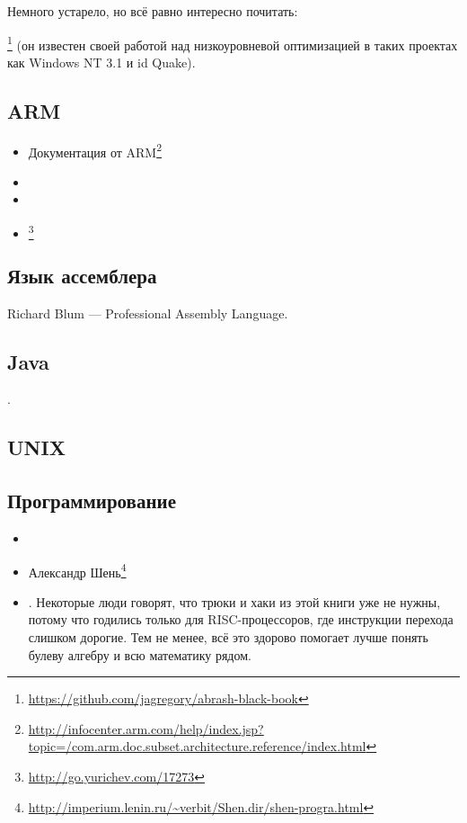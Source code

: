 Немного устарело, но всё равно интересно почитать:

\MAbrash\footnote{\AlsoAvailableAs \url{https://github.com/jagregory/abrash-black-book}}
(он известен своей работой над низкоуровневой оптимизацией в таких проектах как Windows NT 3.1 и id Quake).

\subsection{ARM}

\begin{itemize}
\item Документация от ARM\footnote{\AlsoAvailableAs \url{http://infocenter.arm.com/help/index.jsp?topic=/com.arm.doc.subset.architecture.reference/index.html}}

\item \ARMSevenRef

\item \ARMSixFourRefURL

\item \ARMCookBook\footnote{\AlsoAvailableAs \url{http://go.yurichev.com/17273}}
\end{itemize}

\subsection{Язык ассемблера}

Richard Blum --- Professional Assembly Language.

\subsection{Java}

\JavaBook.

\subsection{UNIX}

\TAOUP

\subsection{Программирование}

\begin{itemize}

\item \RobPikePractice

\item Александр Шень\footnote{\url{http://imperium.lenin.ru/~verbit/Shen.dir/shen-progra.html}}

\item \HenryWarren.
Некоторые люди говорят, что трюки и хаки из этой книги уже не нужны, потому что годились только для \ac{RISC}-процессоров,
где инструкции перехода слишком дорогие.
Тем не менее, всё это здорово помогает лучше понять булеву алгебру и всю математику рядом.

\end{itemize}

